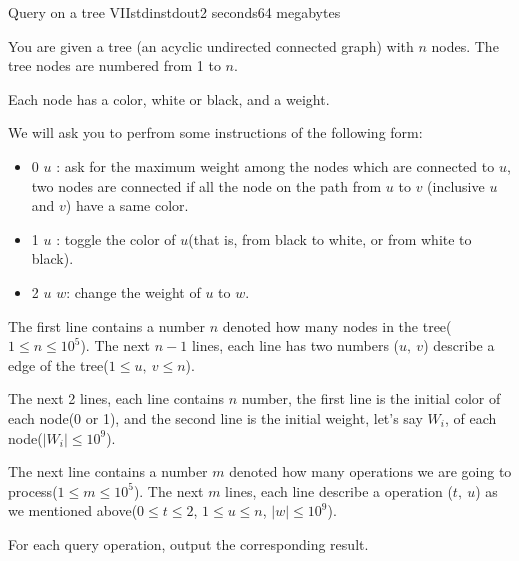 \begin{problem}{Query on a tree VII}{stdin}{stdout}{2 seconds}{64 megabytes}

You are given a tree (an acyclic undirected connected graph) with $n$ nodes. The tree nodes are numbered from 1 to $n$. 

Each node has a color, white or black, and a weight.

We will ask you to perfrom some instructions of the following form:

\begin{itemize}
\item 0 $u$ : ask for the maximum weight among the nodes which are connected to $u$, two nodes are connected if all the node on the path from $u$ to $v$ (inclusive $u$ and $v$) have a same color.
\item 1 $u$ : toggle the color of $u$(that is, from black to white, or from white to black).
\item 2 $u$ $w$: change the weight of $u$ to $w$.
\end{itemize}

\InputFile
The first line contains a number $n$ denoted how many nodes in the tree($1\leq n\leq 10^5$). 
The next $n-1$ lines, each line has two numbers ($u,\ v$) describe a edge of the tree($1\leq u,\ v\leq n$). 

The next 2 lines, each line contains $n$ number, the first line is the initial color of each node(0 or 1), and the second line is the initial weight, let's say $W_i$, of each node($|W_i|\leq 10^9$).


The next line contains a number $m$ denoted how many operations we are going to process($1\leq m\leq 10^5$). The next $m$ lines, each line describe a operation ($t,\ u$) as we mentioned above($0\leq t\leq 2$, $1\leq u\leq n$, $|w| \leq 10^9$).

\OutputFile
For each query operation, output the corresponding result.

\Examples

\begin{example}
%
%
\end{example}

\end{problem}
